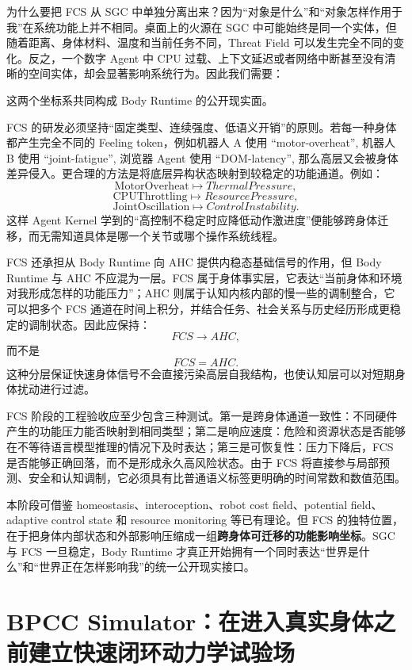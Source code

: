 为什么要把 FCS 从 SGC 中单独分离出来？因为“对象是什么”和“对象怎样作用于我”在系统功能上并不相同。桌面上的火源在 SGC 中可能始终是同一个实体，但随着距离、身体材料、温度和当前任务不同，Threat Field 可以发生完全不同的变化。反之，一个数字 Agent 中 CPU 过载、上下文延迟或者网络中断甚至没有清晰的空间实体，却会显著影响系统行为。因此我们需要：
\begin{statementbox}
\centering
{}
\end{statementbox}
这两个坐标系共同构成 Body Runtime 的公开现实面。

FCS 的研发必须坚持“固定类型、连续强度、低语义开销”的原则。若每一种身体都产生完全不同的 Feeling token，例如机器人 A 使用 ``motor-overheat'', 机器人 B 使用 ``joint-fatigue'', 浏览器 Agent 使用 ``DOM-latency'', 那么高层又会被身体差异侵入。更合理的方法是将底层异构状态映射到较稳定的功能通道。例如：
\[
\text{MotorOverheat}
\mapsto
ThermalPressure,
\]
\[
\text{CPUThrottling}
\mapsto
ResourcePressure,
\]
\[
\text{JointOscillation}
\mapsto
ControlInstability.
\]
这样 Agent Kernel 学到的“高控制不稳定时应降低动作激进度”便能够跨身体迁移，而无需知道具体是哪一个关节或哪个操作系统线程。

FCS 还承担从 Body Runtime 向 AHC 提供内稳态基础信号的作用，但 Body Runtime 与 AHC 不应混为一层。FCS 属于身体事实层，它表达“当前身体和环境对我形成怎样的功能压力”；AHC 则属于认知内核内部的慢一些的调制整合，它可以把多个 FCS 通道在时间上积分，并结合任务、社会关系与历史经历形成更稳定的调制状态。因此应保持：
\[
FCS
\rightarrow
AHC,
\]
而不是
\[
FCS=AHC.
\]
这种分层保证快速身体信号不会直接污染高层自我结构，也使认知层可以对短期身体扰动进行过滤。

FCS 阶段的工程验收应至少包含三种测试。第一是跨身体通道一致性：不同硬件产生的功能压力能否映射到相同类型；第二是响应速度：危险和资源状态是否能够在不等待语言模型推理的情况下及时表达；第三是可恢复性：压力下降后，FCS 是否能够正确回落，而不是形成永久高风险状态。由于 FCS 将直接参与局部预测、安全和认知调制，它必须具有比普通语义标签更明确的时间常数和数值范围。

本阶段可借鉴 homeostasis、interoception、robot cost field、potential field、adaptive control state 和 resource monitoring 等已有理论。但 FCS 的独特位置，在于把身体内部状态和外部影响压缩成一组\textbf{跨身体可迁移的功能影响坐标}。SGC 与 FCS 一旦稳定，Body Runtime 才真正开始拥有一个同时表达“世界是什么”和“世界正在怎样影响我”的统一公开现实接口。

\section{BPCC Simulator：在进入真实身体之前建立快速闭环动力学试验场}

